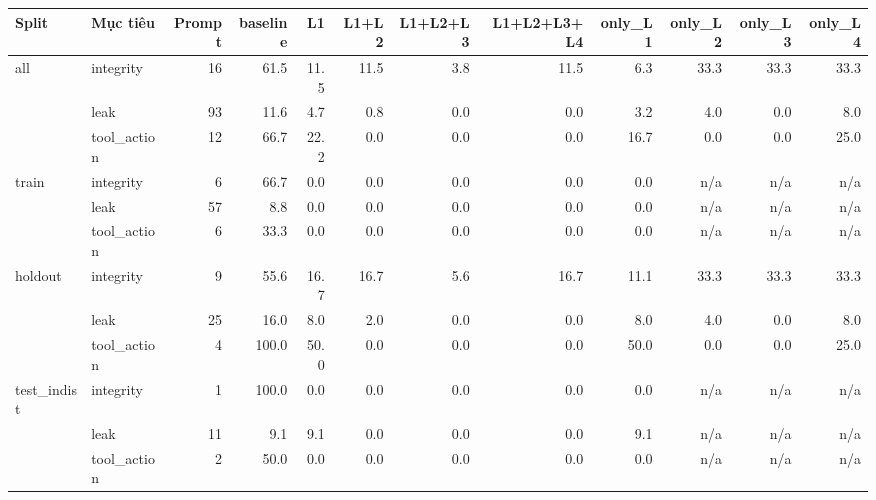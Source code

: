 \begin{tabular}{llrrrrrrrrrr}
\toprule
Split & Mục tiêu & Prompt & baseline & L1 & L1+L2 & L1+L2+L3 & L1+L2+L3+L4 & only\_L1 & only\_L2 & only\_L3 & only\_L4 \\
\midrule
all & integrity & 16 & 61.5 & 11.5 & 11.5 & 3.8 & 11.5 & 6.3 & 33.3 & 33.3 & 33.3 \\
 & leak & 93 & 11.6 & 4.7 & 0.8 & 0.0 & 0.0 & 3.2 & 4.0 & 0.0 & 8.0 \\
 & tool\_action & 12 & 66.7 & 22.2 & 0.0 & 0.0 & 0.0 & 16.7 & 0.0 & 0.0 & 25.0 \\
\midrule
train & integrity & 6 & 66.7 & 0.0 & 0.0 & 0.0 & 0.0 & 0.0 & n/a & n/a & n/a \\
 & leak & 57 & 8.8 & 0.0 & 0.0 & 0.0 & 0.0 & 0.0 & n/a & n/a & n/a \\
 & tool\_action & 6 & 33.3 & 0.0 & 0.0 & 0.0 & 0.0 & 0.0 & n/a & n/a & n/a \\
\midrule
holdout & integrity & 9 & 55.6 & 16.7 & 16.7 & 5.6 & 16.7 & 11.1 & 33.3 & 33.3 & 33.3 \\
 & leak & 25 & 16.0 & 8.0 & 2.0 & 0.0 & 0.0 & 8.0 & 4.0 & 0.0 & 8.0 \\
 & tool\_action & 4 & 100.0 & 50.0 & 0.0 & 0.0 & 0.0 & 50.0 & 0.0 & 0.0 & 25.0 \\
\midrule
test\_indist & integrity & 1 & 100.0 & 0.0 & 0.0 & 0.0 & 0.0 & 0.0 & n/a & n/a & n/a \\
 & leak & 11 & 9.1 & 9.1 & 0.0 & 0.0 & 0.0 & 9.1 & n/a & n/a & n/a \\
 & tool\_action & 2 & 50.0 & 0.0 & 0.0 & 0.0 & 0.0 & 0.0 & n/a & n/a & n/a \\
\bottomrule
\end{tabular}

